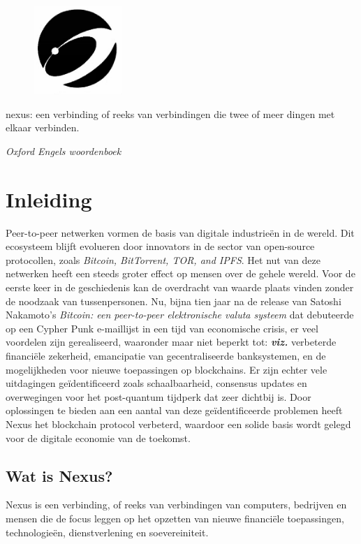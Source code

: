 \documentclass[11pt]{article}
\begin{document}
\begin{figure}
    \centering
    \vspace{-25pt}
    \hspace{-15pt}
    \includegraphics[width=0.30\textwidth]{./images/IMG_1228.JPG}
\end{figure}

\epigraph{nexus: een verbinding of reeks van verbindingen die twee of meer dingen met elkaar verbinden.}{\textit{\footnotesize{Oxford Engels woordenboek}}}

\section{Inleiding}

Peer-to-peer netwerken vormen de basis van digitale industrie\"en in de wereld. Dit ecosysteem blijft evolueren door innovators in de sector van open-source protocollen, zoals \textit{Bitcoin, BitTorrent, TOR, and IPFS}.
Het nut van deze netwerken heeft een steeds groter effect op mensen over de gehele wereld. Voor de eerste keer in de geschiedenis kan de overdracht van waarde plaats vinden zonder de noodzaak van tussenpersonen.
Nu, bijna tien jaar na de release van Satoshi Nakamoto's \textit{Bitcoin: een peer-to-peer elektronische valuta systeem} \cite{bitcoin} dat debuteerde op een Cypher Punk e-maillijst in een tijd van economische crisis, er veel voordelen zijn gerealiseerd, waaronder maar niet beperkt tot: \textbf{\textit{viz.}} verbeterde financi\"ele zekerheid, emancipatie van gecentraliseerde banksystemen, en de mogelijkheden voor nieuwe toepassingen op blockchains. Er zijn echter vele uitdagingen ge\"identificeerd zoals schaalbaarheid, consensus updates en overwegingen voor het post-quantum tijdperk dat zeer dichtbij is. Door oplossingen te bieden aan een ​​aantal van deze ge\"identificeerde problemen heeft Nexus het blockchain protocol verbeterd, waardoor een solide basis wordt gelegd voor de digitale economie van de toekomst. 
\bigskip

\subsection{Wat is Nexus?}
Nexus is een verbinding, of reeks van verbindingen van computers, bedrijven en mensen die de focus leggen op het opzetten van nieuwe financi\"ele toepassingen, technologie\"en, dienstverlening en soevereiniteit.  
\end{document}
